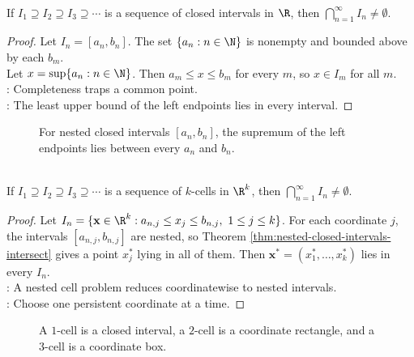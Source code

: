 \begin{theorem} \label{thm:nested-closed-intervals-intersect} \\
If $I_1\supseteq I_2\supseteq I_3\supseteq\cdots$ is a sequence of closed intervals in $\R$, then $\bigcap_{n=1}^{\infty}I_n\neq\emptyset$.
\begin{proof}
Let $I_n=[a_n,b_n]$. The set $\{a_n:n\in\N\}$ is nonempty and bounded above by each $b_m$.\\
Let $x=\sup\{a_n:n\in\N\}$. Then $a_m\leq x\leq b_m$ for every $m$, so $x\in I_m$ for all $m$.\\
: Completeness traps a common point.\\
: The least upper bound of the left endpoints lies in every interval.
\end{proof}
\end{theorem}

\begin{figure}[H]
  \centering
  
  \caption{For nested closed intervals $[a_n,b_n]$, the supremum of the left endpoints lies between every $a_n$ and $b_n$.}
  \label{fig:nested-closed-intervals-lub}
\end{figure}

\begin{theorem} \label{thm:nested-k-cells-intersect} \\
If $I_1\supseteq I_2\supseteq I_3\supseteq\cdots$ is a sequence of $k$-cells in $\R^k$, then $\bigcap_{n=1}^{\infty}I_n\neq\emptyset$.
\begin{proof}
Let $I_n=\{\mathbf{x}\in\R^k:a_{n,j}\leq x_j\leq b_{n,j},\ 1\leq j\leq k\}$. For each coordinate $j$, the intervals $[a_{n,j},b_{n,j}]$ are nested, so Theorem \ref{thm:nested-closed-intervals-intersect} gives a point $x_j^*$ lying in all of them. Then $\mathbf{x}^*=(x_1^*,\ldots,x_k^*)$ lies in every $I_n$.\\
: A nested cell problem reduces coordinatewise to nested intervals.\\
: Choose one persistent coordinate at a time.
\end{proof}
\end{theorem}

\begin{figure}[H]
  \centering
  
  \caption{A $1$-cell is a closed interval, a $2$-cell is a coordinate rectangle, and a $3$-cell is a coordinate box.}
  \label{fig:k-cell-low-dimensional-examples}
\end{figure}

